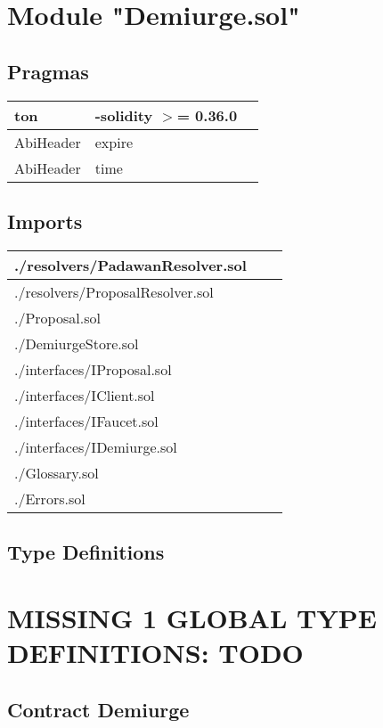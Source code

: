 
\section{Module "Demiurge.sol"}


\subsection{Pragmas}


\noindent\begin{tabular}{|l|l|p{5cm}|}\hline
ton & -solidity $>$= 0.36.0 &\\\hline
AbiHeader &  expire &\\\hline
AbiHeader &  time &\\\hline
\end{tabular}


\subsection{Imports}


\noindent\begin{tabular}{|l|l|p{5cm}|}\hline
./resolvers/PadawanResolver.sol &\\\hline
./resolvers/ProposalResolver.sol &\\\hline
./Proposal.sol &\\\hline
./DemiurgeStore.sol &\\\hline
./interfaces/IProposal.sol &\\\hline
./interfaces/IClient.sol &\\\hline
./interfaces/IFaucet.sol &\\\hline
./interfaces/IDemiurge.sol &\\\hline
./Glossary.sol &\\\hline
./Errors.sol &\\\hline
\end{tabular}


\subsection{Type Definitions}

\section{MISSING 1 GLOBAL TYPE DEFINITIONS: TODO}

\subsection{Contract Demiurge}

